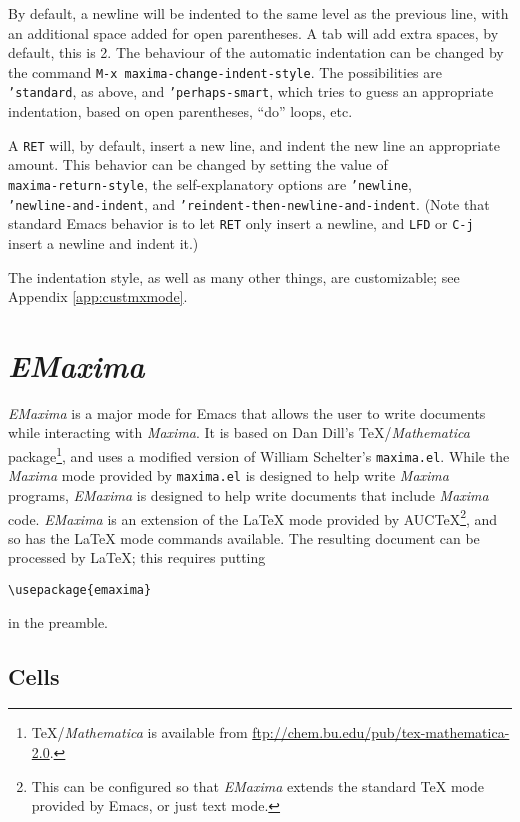 \documentclass{article}
\newcommand{\emx}{\textsl{\sffamily EMaxima}}
\newcommand{\mx}{\textsl{\sffamily Maxima}}
\begin{document}
By default, a newline will be indented to the same level as the
previous line, with an additional space added for open parentheses.  A
tab will add extra spaces, by default, this is 2.  The behaviour of
the automatic indentation can be changed by the command \texttt{M-x
  maxima-change-indent-style}.  The possibilities are
\texttt{'standard}, as above, and \texttt{'perhaps-smart}, which tries
to guess an appropriate indentation, based on open parentheses, ``do''
loops, etc.

A \texttt{RET} will, by default, insert a new line, and indent the new
line an appropriate amount.  This behavior can be changed by setting
the value of \\
\texttt{maxima-return-style}, the self-explanatory options are
\texttt{'newline},\\
\texttt{'newline-and-indent}, and 
\texttt{'reindent-then-newline-and-indent}.  (Note that standard Emacs
behavior is to let \texttt{RET} only insert a newline, and
\texttt{LFD} or \texttt{C-j} insert a newline and indent it.)

The indentation style, as well as many other things, are customizable;
see Appendix \ref{app:custmxmode}.


\section{\emx}

\emx{} is a major mode for Emacs that allows the user to write
documents while interacting with \mx.  It is based on Dan Dill's
\TeX{}/\textit{Mathematica} package\footnote{\TeX/\textit{Mathematica}
  is available from \url{ftp://chem.bu.edu/pub/tex-mathematica-2.0}.},
and uses a modified version of William Schelter's \texttt{maxima.el}.
While the \mx{} mode provided by \texttt{maxima.el} is designed to
help write \mx{} programs, \emx{} is designed to help write documents
that include \mx{} code.  \emx{} is an extension of the \LaTeX{} mode
provided by AUC\TeX{}\footnote{This can be configured so that \emx{}
  extends the standard \TeX{} mode provided by Emacs, or just text
  mode.}, and so has the \LaTeX{} mode commands available.  The
resulting document can be processed by \LaTeX{}; this requires putting
\begin{verbatim}
\usepackage{emaxima}
\end{verbatim}
\noindent
in the preamble.

\subsection{Cells}
\end{document}
